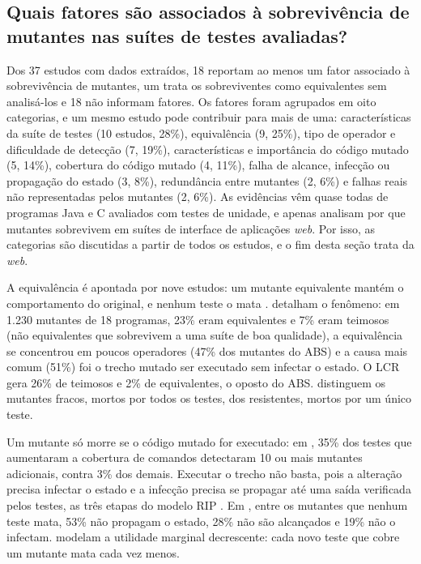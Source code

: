 \subsection{Quais fatores são associados à sobrevivência de mutantes nas suítes de testes avaliadas?}
\label{subsec:fatores-sobrevivencia}

Dos 37 estudos com dados extraídos, 18 reportam ao menos um fator associado à sobrevivência de mutantes, um trata os sobreviventes como equivalentes sem analisá-los \cite{khanfir2023} e 18 não informam fatores. Os fatores foram agrupados em oito categorias, e um mesmo estudo pode contribuir para mais de uma: características da suíte de testes (10 estudos, 28\%), equivalência (9, 25\%), tipo de operador e dificuldade de detecção (7, 19\%), características e importância do código mutado (5, 14\%), cobertura do código mutado (4, 11\%), falha de alcance, infecção ou propagação do estado (3, 8\%), redundância entre mutantes (2, 6\%) e falhas reais não representadas pelos mutantes (2, 6\%). As evidências vêm quase todas de programas Java e C avaliados com testes de unidade, e apenas  analisam por que mutantes sobrevivem em suítes de interface de aplicações \textit{web}. Por isso, as categorias são discutidas a partir de todos os estudos, e o fim desta seção trata da \textit{web}.

A equivalência é apontada por nove estudos: um mutante equivalente mantém o comportamento do original, e nenhum teste o mata \cite{assylbekov2013, tao2025}.  detalham o fenômeno: em 1.230 mutantes de 18 programas, 23\% eram equivalentes e 7\% eram teimosos (não equivalentes que sobrevivem a uma suíte de boa qualidade), a equivalência se concentrou em poucos operadores (47\% dos mutantes do ABS) e a causa mais comum (51\%) foi o trecho mutado ser executado sem infectar o estado. O LCR gera 26\% de teimosos e 2\% de equivalentes, o oposto do ABS.  distinguem os mutantes fracos, mortos por todos os testes, dos resistentes, mortos por um único teste.

Um mutante só morre se o código mutado for executado: em , 35\% dos testes que aumentaram a cobertura de comandos detectaram 10 ou mais mutantes adicionais, contra 3\% dos demais. Executar o trecho não basta, pois a alteração precisa infectar o estado e a infecção precisa se propagar até uma saída verificada pelos testes, as três etapas do modelo RIP \cite{yao2014, lin2018}. Em , entre os mutantes que nenhum teste mata, 53\% não propagam o estado, 28\% não são alcançados e 19\% não o infectam.  modelam a utilidade marginal decrescente: cada novo teste que cobre um mutante mata cada vez menos.

